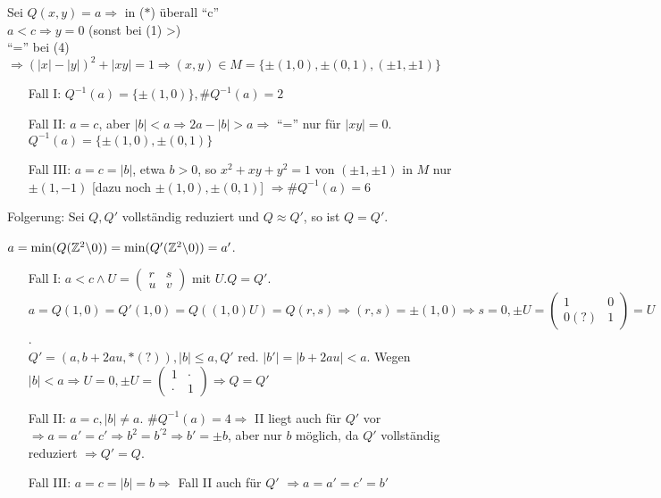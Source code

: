 \documentclass[a4paper,twoside,DIV15,BCOR12mm]{scrbook}
\begin{document}
Sei $Q(x,y) = a \Rightarrow$ in ($\ast$) überall "`c"'\\
$a < c \Rightarrow y = 0$ (sonst bei (1) >)\\
"`="' bei (4) $\Rightarrow (|x|-|y|)^2 + |xy| = 1 \Rightarrow (x,y) \in M = \{\pm (1,0), \pm (0,1), (\pm 1, \pm 1)\}$
\begin{itemize}
\item[Fall I:] $Q^{-1}(a) = \{\pm (1,0)\}, \# Q^{-1}(a) = 2$
\item[Fall II:] $a = c$, aber $|b| < a \Rightarrow 2a-|b| > a \Rightarrow$ "`="' nur für $|xy| = 0$. $Q^{-1}(a) = \{\pm (1,0), \pm (0,1)\}$
\item[Fall III:] $a = c = |b|$, etwa $b > 0$, so $x^2 + xy + y^2 = 1$ von $(\pm 1, \pm 1)$ in $M$ nur $\pm (1, -1)$ [dazu noch $\pm (1,0), \pm(0,1)$] $\Rightarrow \#Q^{-1}(a) = 6$
\end{itemize}

Folgerung: Sei $Q, Q'$ vollständig reduziert und $Q \approx Q'$, so ist $Q = Q'$.
\begin{beweis}
$a = \min (Q(\mathbb{Z}^2 \backslash 0)) = \min (Q'(\mathbb{Z}^2 \backslash 0)) = a'$.
\begin{itemize}
\item[Fall I:] $a < c \wedge U = \begin{pmatrix}r & s \\ u & v\end{pmatrix}$ mit $U.Q = Q'$. $a = Q(1,0) = Q'(1,0) = Q((1,0)U) = Q(r,s) \Rightarrow (r,s) = \pm (1,0) \Rightarrow s = 0, \pm U = \begin{pmatrix}1 & 0\\ 0(?) & 1\end{pmatrix} = U$.\\
$Q' = (a,b + 2au, \ast (?)), |b| \le a, Q' \text{ red}$. $|b'| = |b + 2au| < a$. Wegen $|b| < a \Rightarrow U = 0, \pm U = \begin{pmatrix}1 & \cdot\\ \cdot & 1\end{pmatrix} \Rightarrow Q = Q'$
\item[Fall II:] $a = c, |b| \not= a$. $\# Q^{-1}(a) = 4 \Rightarrow$ II liegt auch für $Q'$ vor $\Rightarrow a = a' = c' \Rightarrow b^2 = b^{'2} \Rightarrow b' = \pm b$, aber nur $b$ möglich, da $Q'$ vollständig reduziert $\Rightarrow Q' = Q$.
\item[Fall III:] $a = c = |b| = b \Rightarrow$ Fall II auch für $Q'$ $\Rightarrow a = a' = c' = b'$
\end{itemize}
\end{beweis}
\end{document}
